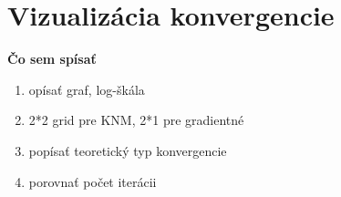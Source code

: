 \documentclass[report.tex]{subfiles}
\begin{document}
\section{Vizualizácia konvergencie}\label{sec:EF}

\textbf{Čo sem spísať}
\begin{enumerate}
	\item opísať graf, log-škála
	\item 2*2 grid pre KNM, 2*1 pre gradientné
	\item popísať teoretický typ konvergencie
	\item porovnať počet iterácii
\end{enumerate}
\end{document}
